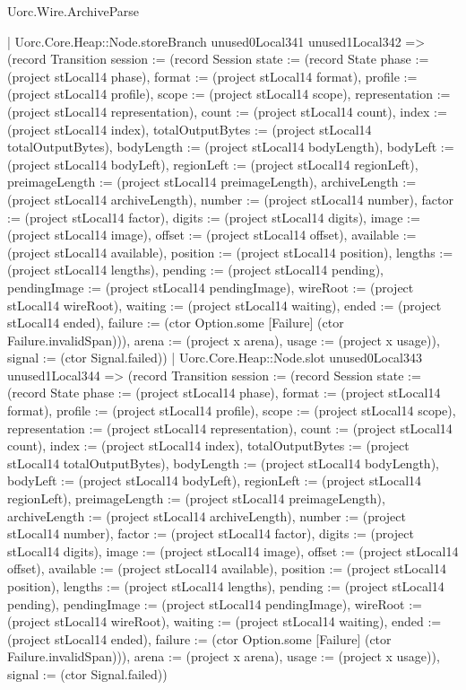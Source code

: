 \begin{lexlean}{Uorc.Wire.ArchiveParse}
\begin{semanticmodule}
{            | Uorc.Core.Heap::Node.storeBranch unused0Local341 unused1Local342 => (record Transition {session := (record Session {state := (record State {phase := (project stLocal14 phase), format := (project stLocal14 format), profile := (project stLocal14 profile), scope := (project stLocal14 scope), representation := (project stLocal14 representation), count := (project stLocal14 count), index := (project stLocal14 index), totalOutputBytes := (project stLocal14 totalOutputBytes), bodyLength := (project stLocal14 bodyLength), bodyLeft := (project stLocal14 bodyLeft), regionLeft := (project stLocal14 regionLeft), preimageLength := (project stLocal14 preimageLength), archiveLength := (project stLocal14 archiveLength), number := (project stLocal14 number), factor := (project stLocal14 factor), digits := (project stLocal14 digits), image := (project stLocal14 image), offset := (project stLocal14 offset), available := (project stLocal14 available), position := (project stLocal14 position), lengths := (project stLocal14 lengths), pending := (project stLocal14 pending), pendingImage := (project stLocal14 pendingImage), wireRoot := (project stLocal14 wireRoot), waiting := (project stLocal14 waiting), ended := (project stLocal14 ended), failure := (ctor Option.some [Failure] (ctor Failure.invalidSpan))}), arena := (project x arena), usage := (project x usage)}), signal := (ctor Signal.failed)})
            | Uorc.Core.Heap::Node.slot unused0Local343 unused1Local344 => (record Transition {session := (record Session {state := (record State {phase := (project stLocal14 phase), format := (project stLocal14 format), profile := (project stLocal14 profile), scope := (project stLocal14 scope), representation := (project stLocal14 representation), count := (project stLocal14 count), index := (project stLocal14 index), totalOutputBytes := (project stLocal14 totalOutputBytes), bodyLength := (project stLocal14 bodyLength), bodyLeft := (project stLocal14 bodyLeft), regionLeft := (project stLocal14 regionLeft), preimageLength := (project stLocal14 preimageLength), archiveLength := (project stLocal14 archiveLength), number := (project stLocal14 number), factor := (project stLocal14 factor), digits := (project stLocal14 digits), image := (project stLocal14 image), offset := (project stLocal14 offset), available := (project stLocal14 available), position := (project stLocal14 position), lengths := (project stLocal14 lengths), pending := (project stLocal14 pending), pendingImage := (project stLocal14 pendingImage), wireRoot := (project stLocal14 wireRoot), waiting := (project stLocal14 waiting), ended := (project stLocal14 ended), failure := (ctor Option.some [Failure] (ctor Failure.invalidSpan))}), arena := (project x arena), usage := (project x usage)}), signal := (ctor Signal.failed)})
}
\end{semanticmodule}
\end{lexlean}
